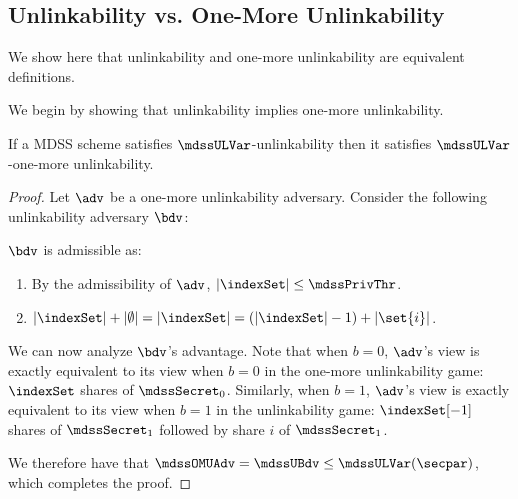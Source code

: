 \subsection{Unlinkability vs. One-More Unlinkability}

We show here that unlinkability and one-more unlinkability are equivalent definitions.

We begin by showing that unlinkability implies one-more unlinkability.
\begin{theorem}
	If a MDSS scheme satisfies $\mdssULVar$-unlinkability then it satisfies $\mdssULVar$-one-more unlinkability.
\end{theorem}

\begin{proof}
	Let $\adv$ be a one-more unlinkability adversary.
	Consider the following unlinkability adversary $\bdv$:
	\begin{pcvstack}[center, space=1em]

	\end{pcvstack}

	$\bdv$ is admissible as:
	\begin{enumerate}
		\item By the admissibility of $\adv$, $|\indexSet| \leq \mdssPrivThr$.
		\item $|\indexSet| + |\emptyset| = \left|\indexSet\right| = (|\indexSet| - 1) + |\set{i}|$.
	\end{enumerate}

	We can now analyze $\bdv$'s advantage.
	Note that when $b = 0$, $\adv$'s view is exactly equivalent to its view when $b = 0$ in the one-more unlinkability game: $\indexSet$ shares of $\mdssSecret_0$.
	Similarly, when $b = 1$, $\adv$'s view is exactly equivalent to its view when $b = 1$ in the unlinkability game: $\indexSet[-1]$ shares of $\mdssSecret_1$ followed by share $i$ of $\mdssSecret_1$.

	We therefore have that $\mdssOMUAdv = \mdssUBdv \leq \mdssULVar(\secpar)$, which completes the proof.
\end{proof}


